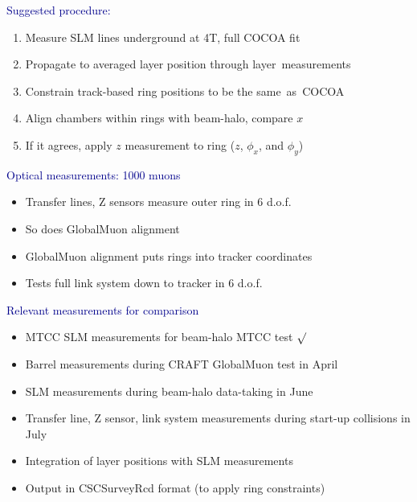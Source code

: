 \documentclass[compress]{beamer}
\begin{document}
\begin{frame}
\vfill
\textcolor{darkblue}{Suggested procedure:}
\begin{enumerate}
\item Measure SLM lines underground at 4T, full COCOA fit
\item Propagate to averaged layer position through \mbox{layer~measurements\hspace{-1 cm}}
\item Constrain track-based ring positions to be the \mbox{same as COCOA\hspace{-1 cm}}
\item Align chambers within rings with beam-halo, compare $x$
\item If it agrees, apply $z$ measurement to ring ($z$, $\phi_x$, and $\phi_y$)
\end{enumerate}
\end{frame}

\begin{frame}
\vfill
\vfill
\vfill
\hspace{-0.83 cm} \textcolor{darkblue}{\Large Optical measurements: 1000 muons}

\begin{itemize}
\item Transfer lines, Z sensors measure outer ring in 6 d.o.f.
\item So does GlobalMuon alignment
\item GlobalMuon alignment puts rings into tracker coordinates
\item Tests full link system down to tracker in 6 d.o.f.
\end{itemize}

\vfill
\hspace{-0.83 cm} \textcolor{darkblue}{\Large Relevant measurements for comparison}

\begin{itemize}
\item MTCC SLM measurements for beam-halo MTCC test \hfill \textcolor{red}{$\surd$}
\item Barrel measurements during CRAFT GlobalMuon test in April
\item SLM measurements during beam-halo data-taking in June
\item Transfer line, Z sensor, link system measurements during start-up collisions in July
\item Integration of layer positions with SLM measurements
\item Output in CSCSurveyRcd format (to apply ring constraints)
\end{itemize}
\end{frame}
\end{document}
